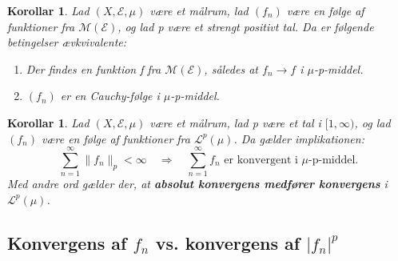 \documentclass{article}
\newcommand{\1}{\mathbbm{1}}
\newcommand{\lclass}{\mathcal{L}}
\theoremstyle{boxed}
\newtheorem{corollary}[theorem]{Korollar}
\begin{document}
\begin{theorem-box}
    \begin{corollary}
        Lad $(X,\mathcal{E}, \mu)$ være et målrum, lad $(f_n)$ være en følge af funktioner fra $\mathcal{M}(\mathcal{E})$, og lad p være et strengt positivt tal. Da er følgende betingelser ævkvivalente:
        \begin{enumerate}
            \item[\textnormal{(i)}] Der findes en funktion f fra $\mathcal{M}(\mathcal{E})$, således at $f_n\rightarrow f$ i $\mu$-p-middel.
            \item[\textnormal{(ii)}] $(f_n)$ er en Cauchy-følge i $\mu$-p-middel.   
        \end{enumerate}
    \end{corollary}
\end{theorem-box}
\begin{theorem-box}
    \begin{corollary}
        Lad $(X,\mathcal{E},\mu)$ være et målrum, lad p være et tal i $[1,\infty)$, og lad $(f_n)$ være en følge af funktioner fra $\lclass^p(\mu)$. Da gælder implikationen:
        $$\sum_{n=1}^{\infty}\|f_n\|_p<\infty\quad\Longrightarrow\quad \sum_{n=1}^{\infty}f_n\text{ er konvergent i }\mu\text{-p-middel.}$$
        Med andre ord gælder der, at \textbf{absolut konvergens medfører konvergens} i $\lclass^p(\mu)$.
    \end{corollary}
\end{theorem-box}
\subsection{Konvergens af $f_n$ vs. konvergens af $|f_n|^p$}
\end{document}
